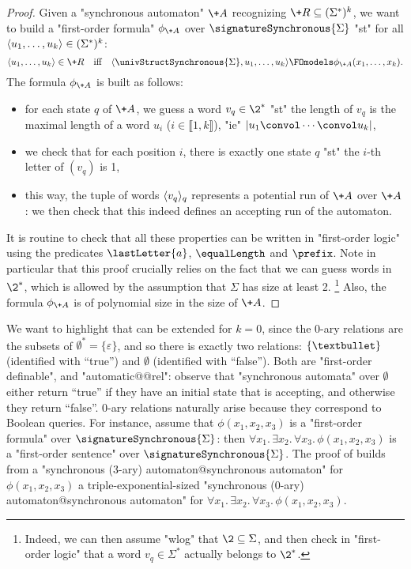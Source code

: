 \begin{proof}
	Given a "synchronous automaton" $\+A$ recognizing $\+R \subseteq (\Sigma^*)^k$,
	we want to build a "first-order formula" $\phi_{\+A}$ over $\signatureSynchronous{\Sigma}$
	"st" for all $\langle u_1,\dotsc, u_k\rangle \in (\Sigma^*)^k$:
	\[
		\tup{u_1,\dotsc, u_k} \in \+R
		\quad\text{iff}\quad
		\tup{\univStructSynchronous{\Sigma}, u_1,\dotsc, u_k} \FOmodels \phi_{\+A}(x_1,\dotsc,x_k).
	\]
	The formula $\phi_{\+A}$ is built as follows:
	\begin{itemize}
		\item for each state $q$ of $\+A$, we guess a word $v_q \in \2^*$ "st"
			the length of $v_q$ is the maximal length of a word $u_i$ ($i \in \lBrack 1,k\rBrack$),
			"ie" $|u_1 \convol \cdots \convol u_k|$,
		\item we check that for each position $i$, there is exactly one state $q$
			"st" the $i$-th letter of $(v_q)$ is 1,
		\item this way, the tuple of words $\langle v_q\rangle_{q}$ represents a potential run of $\+A$
			over $\+A$: we then check that this indeed defines an accepting run of the automaton. 
	\end{itemize}
	It is routine to check that all these properties can be written in "first-order logic"
	using the predicates $\lastLetter{a}$, $\equalLength$ and $\prefix$.
	Note in particular that this proof crucially relies on the fact that we can guess words
	in $\2^*$, which is allowed by the assumption that $\Sigma$ has size at least 2.%
	\footnote{Indeed, we can then assume "wlog" that $\2 \subseteq \Sigma$, and then
	check in "first-order logic" that a word $v_q \in \Sigma^*$ actually
	belongs to $\2^*$.}
	Also, the formula $\phi_{\+A}$ is of polynomial size in the size of $\+A$.
\end{proof}

We want to highlight that  can be extended for $k=0$,
since the $0$-ary relations are the subsets of $\emptyset^* = \{\varepsilon\}$,
and so there is exactly two 
relations: $\{\textbullet\}$ (identified with ``true'') and $\emptyset$ (identified with ``false'').
Both are "first-order definable", and "automatic@@rel": observe that "synchronous automata" over
$\emptyset$ either return ``true'' if they have an initial state that is accepting, and otherwise they return ``false''.
$0$-ary relations naturally arise because they correspond to Boolean queries.
For instance, assume that $\phi(x_1,x_2,x_3)$ is a "first-order formula" over
$\signatureSynchronous{\Sigma}$: then
$\forall x_1.\, \exists x_2.\, \forall x_3.\, \phi(x_1,x_2,x_3)$ is a "first-order sentence"
over $\signatureSynchronous{\Sigma}$. The proof of 
builds from a "synchronous ($3$-ary) automaton@synchronous automaton" for
$\phi(x_1,x_2,x_3)$ a triple-exponential-sized "synchronous ($0$-ary) automaton@synchronous automaton" for $\forall x_1.\, \exists x_2.\, \forall x_3.\, \phi(x_1,x_2,x_3)$.


